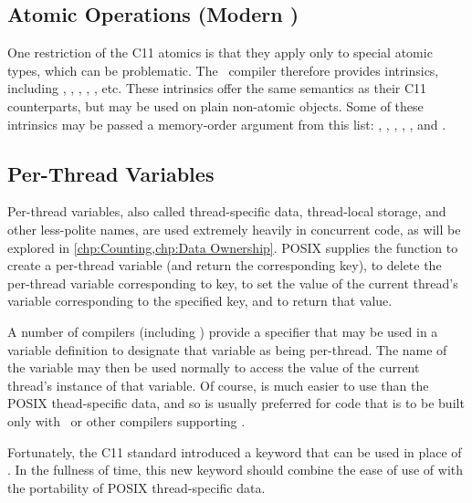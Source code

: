 \subsection{Atomic Operations (Modern \GCC)}
\label{sec:toolsoftrade:Atomic Operations (Modern gcc)}

One restriction of the C11 atomics is that they apply only to special
atomic types, which can be problematic.
The \GNUC\ compiler therefore provides  intrinsics, including
,
,
,
,
, etc.
These intrinsics offer the same semantics as their C11 counterparts,
but may be used on plain non-atomic objects.
Some of these intrinsics may be passed a memory-order argument from
this list:
,
,
,
,
, and
.

\subsection{Per-Thread Variables}
\label{sec:toolsoftrade:Per-Thread Variables}

Per-thread variables, also called thread-specific data, thread-local
storage, and other less-polite names, are used extremely
heavily in concurrent code, as will be explored in
\cref{chp:Counting,chp:Data Ownership}.
POSIX supplies the  function to create a
per-thread variable (and return the corresponding key),
 to delete the per-thread variable corresponding
to key,
 to set the value of the current thread's
variable corresponding to the specified key,
and  to return that value.

A number of compilers (including \GCC) provide a  specifier
that may be used in a variable definition to designate that variable
as being per-thread.
The name of the variable may then be used normally to access the
value of the current thread's instance of that variable.
Of course,  is much easier to use than the POSIX
thead-specific data, and so  is usually preferred for
code that is to be built only with \GCC\ or other compilers supporting
.

Fortunately, the C11 standard introduced a  keyword
that can be used in place of .
In the fullness of time, this new keyword should combine the ease of use
of  with the portability of POSIX thread-specific data.

